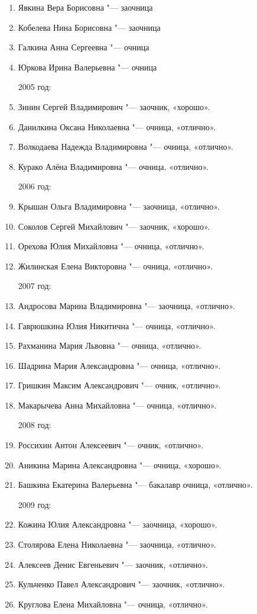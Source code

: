\begin{enumerate}[nosep]
{2004 год:}
	\item Явкина Вера Борисовна "--- заочница
	\item Кобелева Нина Борисовна "--- заочница
	\item Галкина Анна Сергеевна "--- очница
	\item Юркова Ирина Валерьевна "--- очница

{2005 год:}
	\item Зинин Сергей Владимирович "--- заочник, «хорошо».
	\item Данилкина Оксана Николаевна "--- очница, «отлично».
	\item Волкодаева Надежда Владимировна "--- очница, «отлично».
	\item Курако Алёна Владимировна "--- очница, «отлично».
	
{2006 год:}
	\item Крышан Ольга Владимировна "--- заочница, «отлично».
	\item Соколов Сергей Михайлович "--- заочник, «хорошо».
	\item Орехова Юлия Михайловна "--- очница, «отлично».
	\item Жилинская Елена Викторовна "--- очница, «отлично».

\pagebreak	

{2007 год:}
	\item Андросова Марина Владимировна "--- заочница, «отлично».
	\item Гаврюшкина Юлия Никитична "--- очница, «отлично».
	\item Рахманина Мария Львовна "--- очница, «отлично».
	\item Шадрина Мария Александровна "--- очница, «отлично».
	\item Гришкин Максим Александрович "--- очник, «отлично». 
	\item Макарычева Анна Михайловна "--- очница, «отлично».
	
{2008 год:}
	\item Россихин Антон Алексеевич "--- очник, «отлично».
	\item Аникина Марина Александровна "--- очница, «хорошо».
	\item Башкина Екатерина Валерьевна "--- бакалавр очница, «отлично».
	
{2009 год:}
	\item Кожина Юлия Александровна "--- заочница, «хорошо».
	\item Столярова Елена Николаевна "--- заочница, «отлично».
	\item Алексеев Денис Евгеньевич "--- заочник, «отлично».
	\item Кульченко Павел Александрович "--- заочник, «отлично».
	\item Круглова Елена Михайловна "--- очница, «отлично».
	

\end{enumerate}
